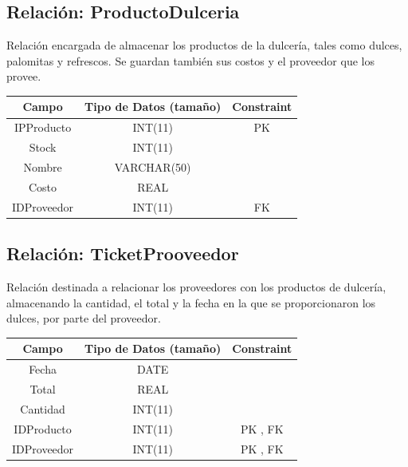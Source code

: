\documentclass[12pt, fleqn]{report}                             %
\begin{document}
        \subsection*{Relación: ProductoDulceria}

            Relación encargada de almacenar los productos de la dulcería, tales como dulces,
            palomitas y refrescos. Se guardan también sus costos y el proveedor que los provee.

            \vspace{2em}

            \small{
            \begin{tabular}{| c | c | c |}
                \hline
                \textbf{Campo} & \textbf{Tipo de Datos (tamaño)} & \textbf{Constraint} \\[0.5ex] 
                \hline\hline
                
                IPProducto      & INT(11)       & PK                    \\
                Stock           & INT(11)       &                       \\
                Nombre          & VARCHAR(50)   &                       \\
                Costo           & REAL          &                       \\
                IDProveedor     & INT(11)       & FK                    \\
                \hline
            \end{tabular}
            }

        \clearpage
        \subsection*{Relación: TicketProoveedor}

            Relación destinada a relacionar los proveedores con los productos de dulcería,
            almacenando la cantidad, el total y la fecha en la que se proporcionaron los dulces,
            por parte del proveedor.

            \vspace{2em}

            \small{
            \begin{tabular}{| c | c | c |}
                \hline
                \textbf{Campo} & \textbf{Tipo de Datos (tamaño)} & \textbf{Constraint} \\[0.5ex] 
                \hline\hline
                
                Fecha       & DATE          &                       \\
                Total       & REAL          &                       \\
                Cantidad    & INT(11)       &                       \\
                IDProducto  & INT(11)       & PK , FK               \\
                IDProveedor & INT(11)       & PK , FK               \\
                \hline
            \end{tabular}
            }
\end{document}
